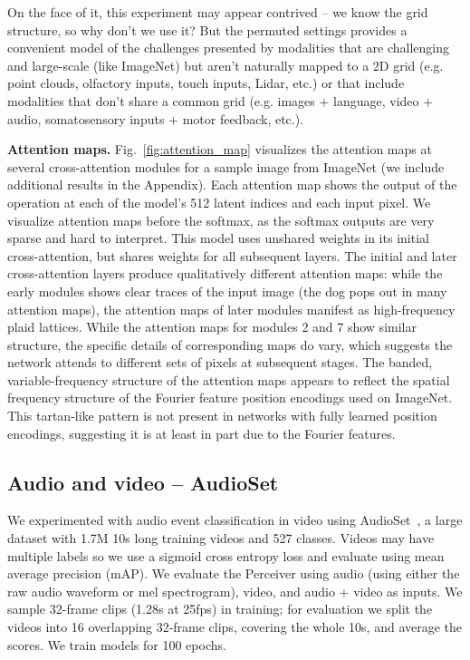 \documentclass{article}
\begin{document}
On the face of it, this experiment may appear contrived -- we know the grid structure, so why don't we use it? But the permuted settings provides a convenient model of the challenges presented by modalities that are challenging and large-scale (like ImageNet) but aren't naturally mapped to a 2D grid (e.g. point clouds, olfactory inputs, touch inputs, Lidar, etc.) or that include modalities that don't share a common grid (e.g. images + language, video + audio, somatosensory inputs + motor feedback, etc.).


\noindent \textbf{Attention maps.} Fig.~\ref{fig:attention_map} visualizes the attention maps at several cross-attention modules for a sample image from ImageNet (we include additional results in the Appendix). Each attention map shows the output of the  operation at each of the model's 512 latent indices and each input pixel. We visualize attention maps before the softmax, as the softmax outputs are very sparse and hard to interpret. This model uses unshared weights in its initial cross-attention, but shares weights for all subsequent layers. The initial and later cross-attention layers produce qualitatively different attention maps: while the early modules shows clear traces of the input image (the dog pops out in many attention maps), the attention maps of later modules manifest as high-frequency plaid lattices. While the attention maps for modules 2 and 7 show similar structure, the specific details of corresponding maps do vary, which suggests the network attends to different sets of pixels at subsequent stages. The banded, variable-frequency structure of the attention maps appears to reflect the spatial frequency structure of the Fourier feature position encodings used on ImageNet. This tartan-like pattern is not present in networks with fully learned position encodings, suggesting it is at least in part due to the Fourier features. 

\subsection{Audio and video -- AudioSet}
\label{sec:audioset}

We experimented with audio event classification in video using AudioSet~\cite{gemmeke2017audio}, a large dataset with 1.7M 10s long training videos and 527 classes. Videos may have multiple labels so we use a sigmoid cross entropy loss and evaluate using mean average precision (mAP). We evaluate the Perceiver using audio (using either the raw audio waveform or mel spectrogram), video, and audio + video as inputs. We sample 32-frame clips (1.28s at 25fps) in training; for evaluation we split the videos into 16 overlapping 32-frame clips, covering the whole 10s, and average the scores. We train models for 100 epochs.
\end{document}
